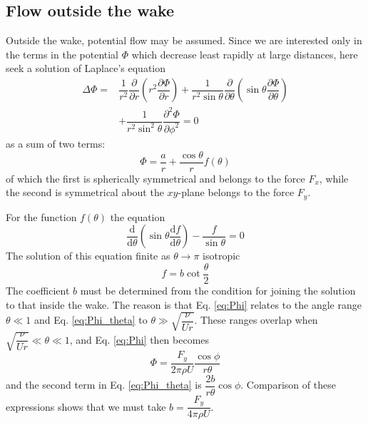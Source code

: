\documentclass[conference]{IEEEtran}
\theoremstyle{definition}
\theoremstyle{remark}
\begin{document}
    \subsection{Flow outside the wake}
    Outside the wake, potential flow may be assumed. Since we are interested only in the terms in the potential $\Phi$ which decrease least rapidly at large distances, here seek a solution of Laplace's equation
    \begin{align*}
        \Delta \Phi =& \dfrac1{r^2} \dfrac{\partial}{\partial r} \left(r^2 \dfrac{\partial \Phi}{\partial r} \right) + \dfrac1{r^2 \sin \theta} \dfrac{\partial}{\partial \theta} \left( \sin \theta \dfrac{\partial \Phi}{\partial \theta} \right) \\
        &+ \dfrac1{r^2 \sin^2 \theta}\dfrac{\partial^2 \Phi}{\partial \phi^2} = 0
    \end{align*}
    as a sum of two terms:
    \begin{equation}
        \Phi = \dfrac{a}{r} + \dfrac{\cos \theta}{r} f(\theta)
    \end{equation}
    of which the first is spherically symmetrical and belongs to the force $F_x$, while the second is symmetrical about the $xy$-plane belongs to the force $F_y$.

    For the function $f(\theta)$ the equation
    \begin{equation*}
        \dfrac{\mathrm{d}}{\mathrm{d} \theta} \left( \sin \theta \dfrac{\mathrm{d} f}{\mathrm{d} \theta} \right) - \dfrac{f}{\sin \theta} = 0
    \end{equation*}
    The solution of this equation finite as $\theta \to \pi$ isotropic
    \begin{equation*}
        f = b \cot \dfrac{\theta}2
    \end{equation*}
    The coefficient $b$ must be determined from the condition for joining the solution to that inside the wake. The reason is that Eq. \ref{eq:Phi} relates to the angle range $\theta \ll 1$ and Eq. \ref{eq:Phi_theta} to $\theta \gg \sqrt{\dfrac{\nu}{Ur}}$. These ranges overlap when $\sqrt{\dfrac{\nu}{Ur}} \ll \theta \ll 1$, and Eq. \ref{eq:Phi} then becomes
    \begin{equation*}
        \Phi = \dfrac{F_y}{2\pi \rho U} \dfrac{\cos \phi}{r \theta}
    \end{equation*}
    and the second term in Eq. \ref{eq:Phi_theta} is $\dfrac{2b}{r\theta} \cos \phi$. Comparison of these expressions shows that we must take $b = \dfrac{F_y}{4\pi \rho U}$.
\end{document}
